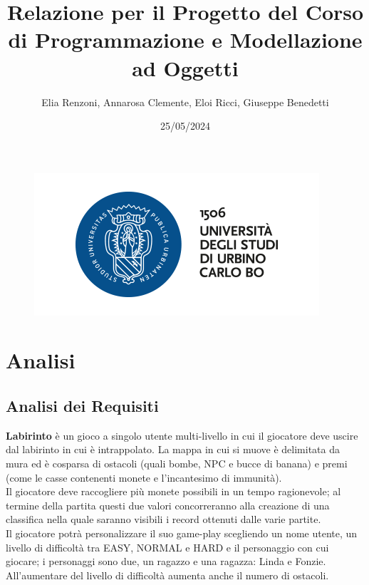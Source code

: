 \documentclass[12pt, letterpaper]{article}
\title{Relazione per il Progetto del Corso di Programmazione e Modellazione ad Oggetti}
\author{Elia Renzoni, Annarosa Clemente, Eloi Ricci, Giuseppe Benedetti}
\date{25/05/2024}
\begin{document}
\begin{figure}
    \centering
    \includegraphics[width=0.5\linewidth]{logo-uni.png}
\end{figure}

\maketitle

\newpage
\tableofcontents
\newpage
\section{Analisi}
    \subsection{Analisi dei Requisiti}
        \textbf{Labirinto} è un gioco a singolo utente multi-livello in cui il giocatore deve uscire dal  labirinto in cui è intrappolato.
        La mappa in cui si muove è delimitata da mura ed è cosparsa di ostacoli (quali bombe, NPC e bucce di banana) e premi (come le casse contenenti monete e l'incantesimo di immunità). 
        \\
        Il giocatore deve raccogliere più monete possibili in un tempo ragionevole; al termine della partita questi due valori concorreranno alla creazione di una classifica nella quale saranno visibili i record ottenuti dalle varie partite. 
        \\
        Il giocatore potrà personalizzare il suo game-play scegliendo un nome utente, un livello di difficoltà tra EASY, NORMAL e HARD e il personaggio con cui giocare; i personaggi sono due, un ragazzo e una ragazza: Linda e Fonzie.
        \\
        All'aumentare del livello di difficoltà aumenta anche il numero di ostacoli.
        \newpage
\end{document}
